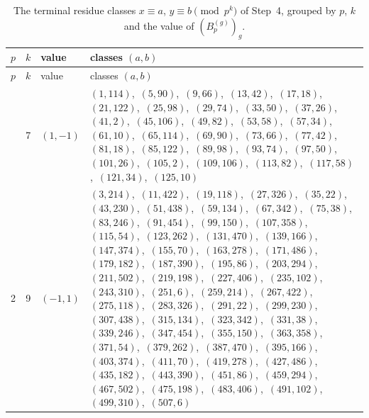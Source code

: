 \documentclass[11pt]{article}
\begin{document}
\begingroup\small
\setlength{\LTcapwidth}{\textwidth}
\begin{longtable}{@{}rrl>{\raggedright\arraybackslash}p{}@{}}
\caption{The terminal residue classes $x\equiv a$, $y\equiv b\pmod{p^k}$ of Step~4, grouped by $p$, $k$ and the value of $(B^{(g)}_p)_g$.}\label{tab:local}\\
\hline $p$ & $k$ & value & classes $(a,b)$\\\hline\endfirsthead
\hline $p$ & $k$ & value & classes $(a,b)$\\\hline\endhead\hline\endfoot
2 & 7 & $(1,-1)$ & $(1,114)$,\allowbreak\ $(5,90)$,\allowbreak\ $(9,66)$,\allowbreak\ $(13,42)$,\allowbreak\ $(17,18)$,\allowbreak\ $(21,122)$,\allowbreak\ $(25,98)$,\allowbreak\ $(29,74)$,\allowbreak\ $(33,50)$,\allowbreak\ $(37,26)$,\allowbreak\ $(41,2)$,\allowbreak\ $(45,106)$,\allowbreak\ $(49,82)$,\allowbreak\ $(53,58)$,\allowbreak\ $(57,34)$,\allowbreak\ $(61,10)$,\allowbreak\ $(65,114)$,\allowbreak\ $(69,90)$,\allowbreak\ $(73,66)$,\allowbreak\ $(77,42)$,\allowbreak\ $(81,18)$,\allowbreak\ $(85,122)$,\allowbreak\ $(89,98)$,\allowbreak\ $(93,74)$,\allowbreak\ $(97,50)$,\allowbreak\ $(101,26)$,\allowbreak\ $(105,2)$,\allowbreak\ $(109,106)$,\allowbreak\ $(113,82)$,\allowbreak\ $(117,58)$,\allowbreak\ $(121,34)$,\allowbreak\ $(125,10)$\\
2 & 9 & $(-1,1)$ & $(3,214)$,\allowbreak\ $(11,422)$,\allowbreak\ $(19,118)$,\allowbreak\ $(27,326)$,\allowbreak\ $(35,22)$,\allowbreak\ $(43,230)$,\allowbreak\ $(51,438)$,\allowbreak\ $(59,134)$,\allowbreak\ $(67,342)$,\allowbreak\ $(75,38)$,\allowbreak\ $(83,246)$,\allowbreak\ $(91,454)$,\allowbreak\ $(99,150)$,\allowbreak\ $(107,358)$,\allowbreak\ $(115,54)$,\allowbreak\ $(123,262)$,\allowbreak\ $(131,470)$,\allowbreak\ $(139,166)$,\allowbreak\ $(147,374)$,\allowbreak\ $(155,70)$,\allowbreak\ $(163,278)$,\allowbreak\ $(171,486)$,\allowbreak\ $(179,182)$,\allowbreak\ $(187,390)$,\allowbreak\ $(195,86)$,\allowbreak\ $(203,294)$,\allowbreak\ $(211,502)$,\allowbreak\ $(219,198)$,\allowbreak\ $(227,406)$,\allowbreak\ $(235,102)$,\allowbreak\ $(243,310)$,\allowbreak\ $(251,6)$,\allowbreak\ $(259,214)$,\allowbreak\ $(267,422)$,\allowbreak\ $(275,118)$,\allowbreak\ $(283,326)$,\allowbreak\ $(291,22)$,\allowbreak\ $(299,230)$,\allowbreak\ $(307,438)$,\allowbreak\ $(315,134)$,\allowbreak\ $(323,342)$,\allowbreak\ $(331,38)$,\allowbreak\ $(339,246)$,\allowbreak\ $(347,454)$,\allowbreak\ $(355,150)$,\allowbreak\ $(363,358)$,\allowbreak\ $(371,54)$,\allowbreak\ $(379,262)$,\allowbreak\ $(387,470)$,\allowbreak\ $(395,166)$,\allowbreak\ $(403,374)$,\allowbreak\ $(411,70)$,\allowbreak\ $(419,278)$,\allowbreak\ $(427,486)$,\allowbreak\ $(435,182)$,\allowbreak\ $(443,390)$,\allowbreak\ $(451,86)$,\allowbreak\ $(459,294)$,\allowbreak\ $(467,502)$,\allowbreak\ $(475,198)$,\allowbreak\ $(483,406)$,\allowbreak\ $(491,102)$,\allowbreak\ $(499,310)$,\allowbreak\ $(507,6)$\\

\end{longtable}
\end{document}
